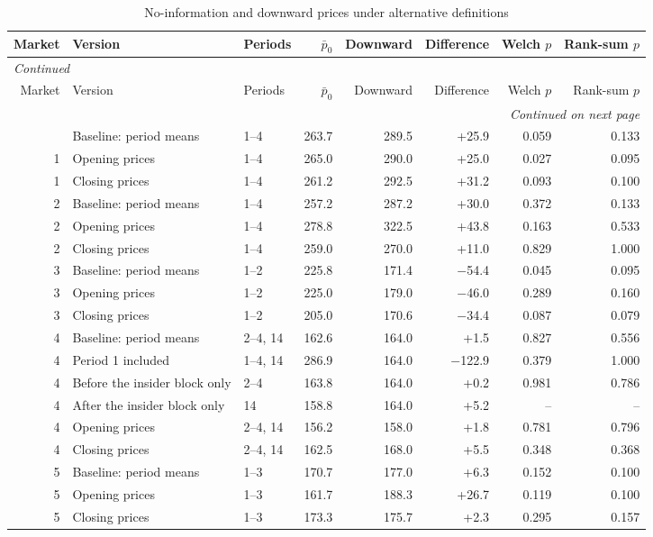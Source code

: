 \scriptsize
\begin{longtable}{rp{3.6cm}lrrrrr}
\caption{No-information and downward prices under alternative definitions}\label{tab:app-noinfo-variants}\\
\toprule
Market & Version & Periods & $\bar p_0$ & Downward & Difference & Welch $p$ & Rank-sum $p$ \\
\midrule
\endfirsthead
\multicolumn{8}{l}{\textit{Continued}}\\
\toprule
Market & Version & Periods & $\bar p_0$ & Downward & Difference & Welch $p$ & Rank-sum $p$ \\
\midrule
\endhead
\midrule
\multicolumn{8}{r}{\textit{Continued on next page}}\\
\endfoot
\bottomrule
\endlastfoot
1 & Baseline: period means & 1--4 & 263.7 & 289.5 & +25.9 & 0.059 & 0.133 \\
1 & Opening prices & 1--4 & 265.0 & 290.0 & +25.0 & 0.027 & 0.095 \\
1 & Closing prices & 1--4 & 261.2 & 292.5 & +31.2 & 0.093 & 0.100 \\
2 & Baseline: period means & 1--4 & 257.2 & 287.2 & +30.0 & 0.372 & 0.133 \\
2 & Opening prices & 1--4 & 278.8 & 322.5 & +43.8 & 0.163 & 0.533 \\
2 & Closing prices & 1--4 & 259.0 & 270.0 & +11.0 & 0.829 & 1.000 \\
3 & Baseline: period means & 1--2 & 225.8 & 171.4 & $-$54.4 & 0.045 & 0.095 \\
3 & Opening prices & 1--2 & 225.0 & 179.0 & $-$46.0 & 0.289 & 0.160 \\
3 & Closing prices & 1--2 & 205.0 & 170.6 & $-$34.4 & 0.087 & 0.079 \\
4 & Baseline: period means & 2--4, 14 & 162.6 & 164.0 & +1.5 & 0.827 & 0.556 \\
4 & Period 1 included & 1--4, 14 & 286.9 & 164.0 & $-$122.9 & 0.379 & 1.000 \\
4 & Before the insider block only & 2--4 & 163.8 & 164.0 & +0.2 & 0.981 & 0.786 \\
4 & After the insider block only & 14 & 158.8 & 164.0 & +5.2 & -- & -- \\
4 & Opening prices & 2--4, 14 & 156.2 & 158.0 & +1.8 & 0.781 & 0.796 \\
4 & Closing prices & 2--4, 14 & 162.5 & 168.0 & +5.5 & 0.348 & 0.368 \\
5 & Baseline: period means & 1--3 & 170.7 & 177.0 & +6.3 & 0.152 & 0.100 \\
5 & Opening prices & 1--3 & 161.7 & 188.3 & +26.7 & 0.119 & 0.100 \\
5 & Closing prices & 1--3 & 173.3 & 175.7 & +2.3 & 0.295 & 0.157 \\
\end{longtable}

